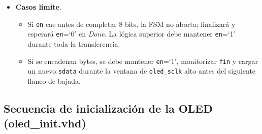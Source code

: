 \documentclass[a4paper,12pt]{article}
\begin{document}
\begin{itemize}
  \item \textbf{Casos límite}.  
        \begin{itemize}
          \item Si \texttt{en} cae antes de completar 8 bits, la FSM no aborta; finalizará y esperará \texttt{en}=‘0’ en \emph{Done}. La lógica superior debe mantener \texttt{en}=‘1’ durante toda la transferencia.
          \item Si se encadenan bytes, se debe mantener \texttt{en}=‘1’, monitorizar \texttt{fin} y cargar un nuevo \texttt{sdata} durante la ventana de \texttt{oled\_sclk} alto antes del siguiente flanco de bajada.
        \end{itemize}
\end{itemize}

\subsection{Secuencia de inicialización de la OLED (oled_init.vhd)}
\label{sec:oled_init}
\end{document}

